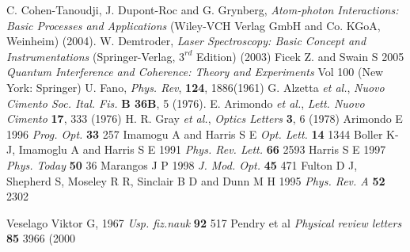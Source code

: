 \begin{thebibliography}{21}
C. Cohen-Tanoudji, J. Dupont-Roc and G. Grynberg, \textit{Atom-photon Interactions: Basic Processes and Applications} (Wiley-VCH Verlag GmbH and Co. KGoA, Weinheim) (2004).
W. Demtroder, \textit{Laser Spectroscopy: Basic Concept and Instrumentations} (Springer-Verlag,  $3^{rd}$ Edition) (2003)
Ficek Z. and Swain S 2005 \textit{Quantum Interference and Coherence: Theory and Experiments} Vol 100 (New York: Springer)
U. Fano, \textit{Phys. Rev}, \textbf{124}, 1886(1961)
G. Alzetta \textit{et al.}, \textit{Nuovo Cimento Soc. Ital. Fis.} \textbf{B 36B}, 5 (1976).
E. Arimondo \textit{et al.}, \textit{Lett. Nuovo Cimento} \textbf{17}, 333 (1976)
H. R. Gray \textit{et al.}, \textit{Optics Letters} \textbf{3}, 6 (1978)
Arimondo E 1996 \textit{Prog. Opt.} \textbf{33} 257
Imamogu A and Harris S E \textit{Opt. Lett.} \textbf{14} 1344
Boller K-J, Imamoglu A and Harris S E 1991 \textit{Phys. Rev. Lett.} \textbf{66} 2593
Harris S E 1997 \textit{Phys. Today} \textbf{50} 36
Marangos J P 1998 \textit{J. Mod. Opt.} \textbf{45} 471
Fulton D J, Shepherd S, Moseley R R, Sinclair B D and Dunn M H 1995 \textit{Phys. Rev. A} \textbf{52} 2302

 Veselago Viktor G, 1967 \textit{Usp. fiz.nauk} \textbf{92} 517
  Pendry et al \textit{Physical review letters} \textbf{85} 3966 (2000



  


\end{thebibliography}
